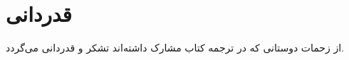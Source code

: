 \chapter*{قدردانی} \label{ack}

از زحمات دوستانی که در ترجمه کتاب مشارک داشته‌اند تشکر و قدردانی می‌گردد. 
